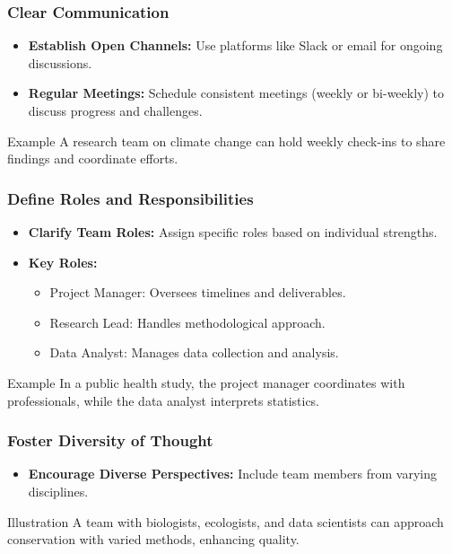 \documentclass[aspectratio=169]{beamer}
\begin{document}
\begin{frame}[fragile]
    \frametitle{Clear Communication}
    \begin{itemize}
        \item \textbf{Establish Open Channels:} Use platforms like Slack or email for ongoing discussions.
        \item \textbf{Regular Meetings:} Schedule consistent meetings (weekly or bi-weekly) to discuss progress and challenges.
    \end{itemize}
    \begin{block}{Example}
        A research team on climate change can hold weekly check-ins to share findings and coordinate efforts.
    \end{block}
\end{frame}

\begin{frame}[fragile]
    \frametitle{Define Roles and Responsibilities}
    \begin{itemize}
        \item \textbf{Clarify Team Roles:} Assign specific roles based on individual strengths.
        \item \textbf{Key Roles:}
        \begin{itemize}
            \item Project Manager: Oversees timelines and deliverables.
            \item Research Lead: Handles methodological approach.
            \item Data Analyst: Manages data collection and analysis.
        \end{itemize}
    \end{itemize}
    \begin{block}{Example}
        In a public health study, the project manager coordinates with professionals, while the data analyst interprets statistics.
    \end{block}
\end{frame}

\begin{frame}[fragile]
    \frametitle{Foster Diversity of Thought}
    \begin{itemize}
        \item \textbf{Encourage Diverse Perspectives:} Include team members from varying disciplines.
    \end{itemize}
    \begin{block}{Illustration}
        A team with biologists, ecologists, and data scientists can approach conservation with varied methods, enhancing quality.
    \end{block}
\end{frame}
\end{document}
